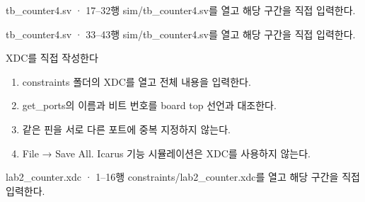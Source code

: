 \begin{frame}{tb\_counter4.sv · 17–32행}
\small
sim/tb\_counter4.sv를 열고 해당 구간을 직접 입력한다.\par\vspace{0.4cm}\par\vspace{0.4cm}
\end{frame}

\begin{frame}{tb\_counter4.sv · 33–43행}
\small
sim/tb\_counter4.sv를 열고 해당 구간을 직접 입력한다.\par\vspace{0.4cm}\par\vspace{0.4cm}
\end{frame}

\begin{frame}{XDC를 직접 작성한다}
\small
\begin{enumerate}
\item constraints 폴더의 XDC를 열고 전체 내용을 입력한다.
\item get\_ports의 이름과 비트 번호를 board top 선언과 대조한다.
\item 같은 핀을 서로 다른 포트에 중복 지정하지 않는다.
\item File → Save All. Icarus 기능 시뮬레이션은 XDC를 사용하지 않는다.
\end{enumerate}
\end{frame}

\begin{frame}{lab2\_counter.xdc · 1–16행}
\small
constraints/lab2\_counter.xdc를 열고 해당 구간을 직접 입력한다.\par\vspace{0.4cm}\par\vspace{0.4cm}
\end{frame}

